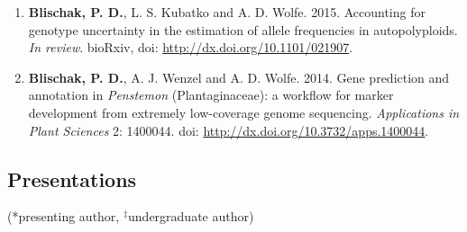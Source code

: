 \documentclass[]{article}
\begin{document}
\begin{enumerate}
\def\labelenumi{\arabic{enumi}.}
\setcounter{enumi}{1}
\item
  \textbf{Blischak, P. D.}, L. S. Kubatko and A. D. Wolfe. 2015.
  Accounting for genotype uncertainty in the estimation of allele
  frequencies in autopolyploids. \emph{In review}. bioRxiv, doi:
  \href{http://dx.doi.org/10.1101/021907}{\url{http://dx.doi.org/10.1101/021907}}.
\item
  \textbf{Blischak, P. D.}, A. J. Wenzel and A. D. Wolfe. 2014. Gene
  prediction and annotation in \textit{Penstemon} (Plantaginaceae): a
  workflow for marker development from extremely low-coverage genome
  sequencing. \emph{Applications in Plant Sciences} 2: 1400044. doi:
  \href{http://dx.doi.org/10.3732/apps.1400044}{\url{http://dx.doi.org/10.3732/apps.1400044}}.
\end{enumerate}

\subsection{\texorpdfstring{\textbf{Presentations}}{Presentations}}\label{presentations}

(*presenting author, \(^{\ddagger}\)undergraduate author)
\end{document}
